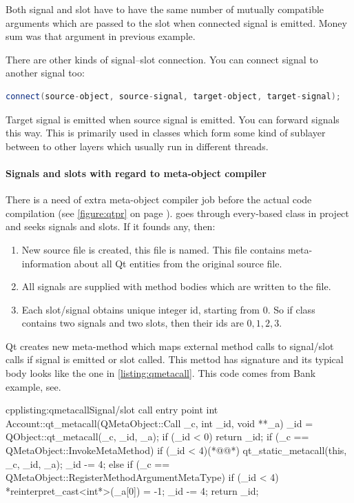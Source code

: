 Both signal and slot have to have the same number of mutually compatible arguments which are passed to the slot when connected signal is emitted. Money sum was that argument in previous example.

There are other kinds of signal--slot connection. You can connect signal to another signal too:
\begin{lstlisting}[firstnumber=1,language=cpp]
connect(source-object, source-signal, target-object, target-signal);
\end{lstlisting}
Target signal is emitted when source signal is emitted. You can forward signals this way. This is primarily used in classes which form some kind of sublayer between to other layers which usually run in different threads.

\paragraph{Signals and slots with regard to meta-object compiler}\label{section:mocfun}
There is a need of extra meta-object compiler job before the actual \cpp code compilation (see \autoref{figure:qtpr} on page \pageref{figure:qtpr}).  goes through every-based class in project and seeks signals and slots. If it founds any, then:
\begin{enumerate}
\item New source file is created, this file is named. This file contains meta-information about all Qt entities from the original source file.
\item All signals are supplied with method bodies which are written to the file.
\item Each slot/signal obtains unique integer id, starting from 0. So if class contains two signals and two slots, then their ids are $0,1,2,3$.
\end{enumerate}

Qt creates new meta-method which maps external method calls to signal/slot calls if signal is emitted or slot called. This mettod has signature and its typical body looks like the one in \autoref{listing:qmetacall}. This code comes from Bank example, see.

\begin{fdoccode}{cpp}{listing:qmetacall}{Signal/slot call entry point}
int Account::qt_metacall(QMetaObject::Call _c, int _id, void **_a)
{
    _id = QObject::qt_metacall(_c, _id, _a);
    if (_id < 0)
        return _id;
    if (_c == QMetaObject::InvokeMetaMethod) {
        if (_id < 4)(*@\label{listing:invoke2}@*)
            qt_static_metacall(this, _c, _id, _a);
        _id -= 4;
    } else if (_c == QMetaObject::RegisterMethodArgumentMetaType) {
        if (_id < 4)
            *reinterpret_cast<int*>(_a[0]) = -1;
        _id -= 4;
    }
    return _id;
}
\end{fdoccode}

